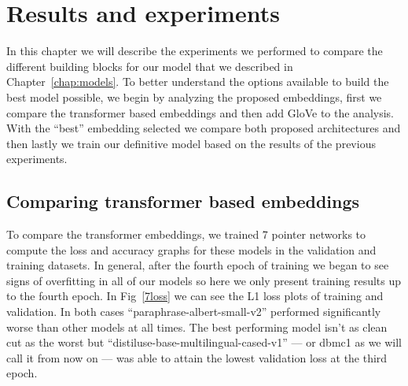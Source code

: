 
\chapter{Results and experiments}
\label{results}

In this chapter we will describe the experiments we performed to compare the different building blocks for our model that we described in Chapter~\ref{chap:models}. To better understand the options available to build the best model possible, we begin by analyzing the proposed embeddings, first we compare the transformer based embeddings and then add GloVe to the analysis. With the ``best'' embedding selected we compare both proposed architectures and then lastly we train our definitive model based on the results of the previous experiments.





\section{Comparing transformer based embeddings}

To compare the transformer embeddings, we trained 7 pointer networks to compute the loss and accuracy graphs for these models in the validation and training datasets. In general, after the fourth epoch of training we began to see signs of overfitting in all of our models so here we only present training results up to the fourth epoch. In Fig~\ref{7loss} we can see the L1 loss plots of training and validation. In both cases ``paraphrase-albert-small-v2''  performed significantly worse than other models at all times. The best performing model isn't as clean cut as the worst but ``distiluse-base-multilingual-cased-v1'' --- or dbmc1 as we will call it from now on --- was able to attain the lowest validation loss at the third epoch.


